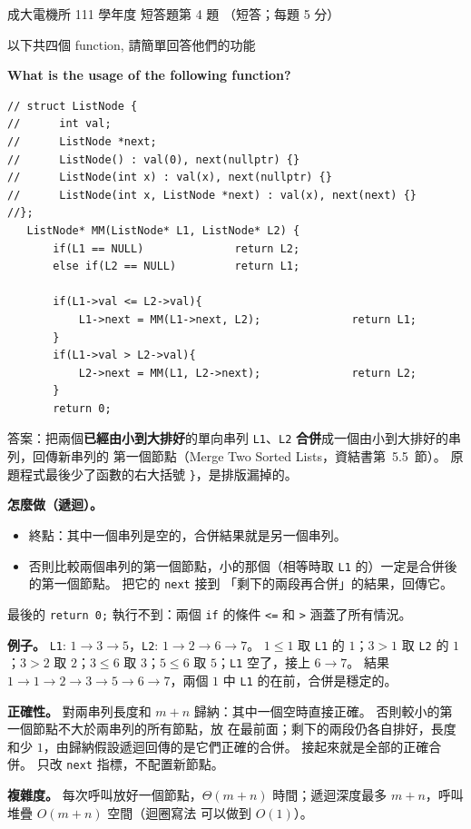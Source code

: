 \begin{pastexam}[label={px:ncku-111-ee-ds-24}]{成大電機所 111 學年度 短答題第 4 題}
（短答；每題 5 分）

以下共四個 function, 請簡單回答他們的功能

\textbf{What is the usage of the following function?}
\begin{verbatim}
// struct ListNode {
//      int val;
//      ListNode *next;
//      ListNode() : val(0), next(nullptr) {}
//      ListNode(int x) : val(x), next(nullptr) {}
//      ListNode(int x, ListNode *next) : val(x), next(next) {}
//};
   ListNode* MM(ListNode* L1, ListNode* L2) {
       if(L1 == NULL)              return L2;
       else if(L2 == NULL)         return L1;

       if(L1->val <= L2->val){
           L1->next = MM(L1->next, L2);              return L1;
       }
       if(L1->val > L2->val){
           L2->next = MM(L1, L2->next);              return L2;
       }
       return 0;
\end{verbatim}
\end{pastexam}

\begin{pastsoln}
答案：把兩個\textbf{已經由小到大排好}的單向串列 \texttt{L1}、\texttt{L2} \textbf{合併}成一個由小到大排好的串列，回傳新串列的
第一個節點（Merge Two Sorted Lists，資結書第~5.5~節）。 原題程式最後少了函數的右大括號 \texttt{\}}，是排版漏掉的。

\textbf{怎麼做（遞迴）。}
\begin{itemize}
\item 終點：其中一個串列是空的，合併結果就是另一個串列。
\item 否則比較兩個串列的第一個節點，小的那個（相等時取 \texttt{L1} 的）一定是合併後的第一個節點。 把它的 \texttt{next} 接到
「剩下的兩段再合併」的結果，回傳它。
\end{itemize}
最後的 \texttt{return 0;} 執行不到：兩個 \texttt{if} 的條件 \texttt{<=} 和 \texttt{>} 涵蓋了所有情況。

\textbf{例子。} \texttt{L1}: $1 \to 3 \to 5$，\texttt{L2}: $1 \to 2 \to 6 \to 7$。 $1 \le 1$ 取 \texttt{L1} 的 $1$；$3 > 1$ 取 \texttt{L2}
的 $1$；$3 > 2$ 取 $2$；$3 \le 6$ 取 $3$；$5 \le 6$ 取 $5$；\texttt{L1} 空了，接上 $6 \to 7$。 結果
$1 \to 1 \to 2 \to 3 \to 5 \to 6 \to 7$，兩個 $1$ 中 \texttt{L1} 的在前，合併是穩定的。

\textbf{正確性。} 對兩串列長度和 $m + n$ 歸納：其中一個空時直接正確。 否則較小的第一個節點不大於兩串列的所有節點，放
在最前面；剩下的兩段仍各自排好，長度和少 $1$，由歸納假設遞迴回傳的是它們正確的合併。 接起來就是全部的正確合併。
只改 \texttt{next} 指標，不配置新節點。

\textbf{複雜度。} 每次呼叫放好一個節點，$\Theta(m + n)$ 時間；遞迴深度最多 $m + n$，呼叫堆疊 $O(m + n)$ 空間（迴圈寫法
可以做到 $O(1)$）。
\end{pastsoln}
